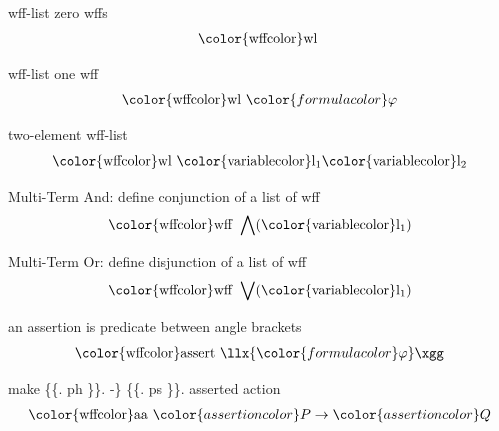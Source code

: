 \begin{lemma} wff-list zero wffs
\begin{align}
{\rm\color{wffcolor} wl}~\label{wfl0}
\end{align}
\end{lemma}

\begin{lemma} wff-list one wff
\begin{align}
{\rm\color{wffcolor} wl}~ {\color{formulacolor}\varphi}\label{wfl1}
\end{align}
\end{lemma}

\begin{lemma} two-element wff-list
\begin{align}
{\rm\color{wffcolor} wl}~ {\rm\color{variablecolor}l_1}
    {\rm\color{variablecolor}l_2}\label{wfl2}
\end{align}
\end{lemma}

\begin{lemma} Multi-Term And:  define conjunction of a list
of wff
\begin{align}
{\rm\color{wffcolor} wff~} \bigwedge( {\rm\color{variablecolor}l_1}
    )\label{wland}
\end{align}
\end{lemma}

\begin{lemma} Multi-Term Or:  define disjunction of a list of
wff
\begin{align}
{\rm\color{wffcolor} wff~} \bigvee( {\rm\color{variablecolor}l_1}
    )\label{wlo}
\end{align}
\end{lemma}

\begin{lemma} an assertion is predicate between angle
brackets
\begin{align}
{\rm\color{wffcolor}assert}~ \llx {\color{formulacolor}\varphi}
    \xgg\label{assrt0}
\end{align}
\end{lemma}

\begin{lemma} make \{\{. ph \}\}. -\} \{\{. ps \}\}.
asserted action
\begin{align}
{\rm\color{wffcolor}aa}~ {\color{assertioncolor}P} \rightarrow
    {\color{assertioncolor}Q}\label{aaarrow}
\end{align}
\end{lemma}

